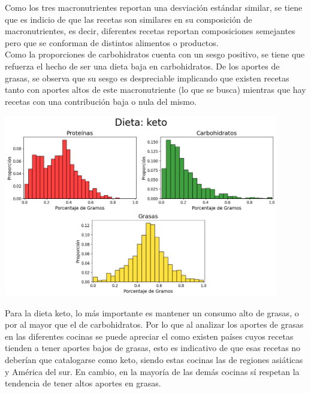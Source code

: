 \documentclass[12pt,a4paper]{article}
\begin{document}
            Como los tres macronutrientes reportan una desviación estándar similar, 
            se tiene que es indicio de que las recetas son similares en su composición 
            de macronutrientes, es decir, diferentes recetas reportan composiciones 
            semejantes pero que se conforman de distintos alimentos o productos.\\

            Como la proporciones de carbohidratos cuenta con un sesgo positivo, se 
            tiene que refuerza el hecho de ser una dieta baja en carbohidratos. 
            De los aportes de grasas, se observa que su sesgo es despreciable implicando 
            que existen recetas tanto con aportes altos de este macronutriente (lo que se 
            busca) mientras que hay recetas con una contribución baja o nula del mismo.
            
            \begin{center}
                \includegraphics[width=0.90\textwidth]{Resources/2_03_plot_02.png}
            \end{center}

            Para la dieta keto, lo más importante es mantener un consumo alto de grasas, o 
            por al mayor que el de carbohidratos. Por lo que al analizar los aportes de grasas 
            en las diferentes cocinas se puede apreciar el como existen países cuyos recetas 
            tienden a tener aportes bajos de grasas, esto es indicativo de que esas recetas no 
            deberían que catalogarse como keto, siendo estas cocinas las de regiones asiáticas
            y América del sur. En cambio, en la mayoría de las demás cocinas sí respetan la 
            tendencia de tener altos aportes en grasas.
\end{document}
